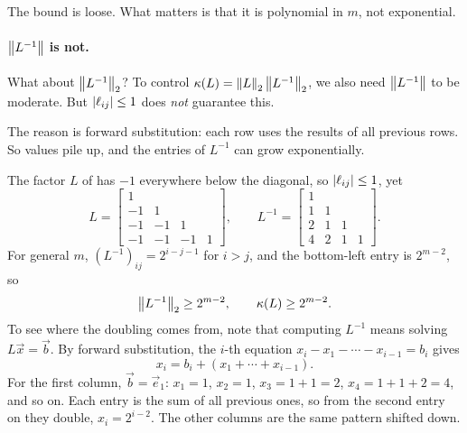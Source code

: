 The bound is loose. What matters is that it is polynomial in $m$, not exponential.

\paragraph{$\left\lVert L^{-1} \right\rVert$ is not.} What about $\left\lVert L^{-1} \right\rVert_2$? To control $\kappa(L) = \left\lVert L \right\rVert_2\left\lVert L^{-1} \right\rVert_2$, we also need $\left\lVert L^{-1} \right\rVert$ to be moderate. But $\left\lvert \ell_{ij} \right\rvert \le 1$ does \emph{not} guarantee this.

The reason is forward substitution: each row uses the results of all previous rows. So values pile up, and the entries of $L^{-1}$ can grow exponentially.

\begin{example}
  \label{ex:linv}
  The factor $L$ of  has $-1$ everywhere below the diagonal, so $\left\lvert \ell_{ij} \right\rvert \le 1$, yet
  \begin{equation}
    L = \begin{bmatrix} 1 & & & \\ -1 & 1 & & \\ -1 & -1 & 1 & \\ -1 & -1 & -1 & 1 \end{bmatrix}, \qquad
    L^{-1} = \begin{bmatrix} 1 & & & \\ 1 & 1 & & \\ 2 & 1 & 1 & \\ 4 & 2 & 1 & 1 \end{bmatrix}.
  \end{equation}
  For general $m$, $(L^{-1})_{ij} = 2^{i-j-1}$ for $i > j$, and the bottom-left entry is $2^{m-2}$, so
  \begin{equation}
    \left\lVert L^{-1} \right\rVert_2 \ge 2^{m-2}, \qquad \kappa(L) \ge 2^{m-2}.
  \end{equation}
  To see where the doubling comes from, note that computing $L^{-1}$ means solving $L\vec{x} = \vec{b}$. By forward substitution, the $i$-th equation $x_i - x_1 - \cdots - x_{i-1} = b_i$ gives
  \begin{equation}
    x_i = b_i + (x_1 + \cdots + x_{i-1}).
  \end{equation}
  For the first column, $\vec{b} = \vec{e}_1$: $x_1 = 1$, $x_2 = 1$, $x_3 = 1 + 1 = 2$, $x_4 = 1 + 1 + 2 = 4$, and so on. Each entry is the sum of all previous ones, so from the second entry on they double, $x_i = 2^{i-2}$. The other columns are the same pattern shifted down.
\end{example}

